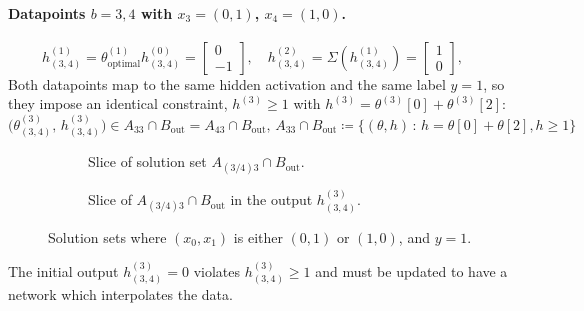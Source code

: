 \paragraph{Datapoints $b=3,4$ with $x_3=(0,1)$, $x_4=(1,0)$.}
\[
    h_{(3,4)}^{(1)} = \theta^{(1)}_{\mathrm{optimal}} h_{(3,4)}^{(0)} = \begin{bmatrix} 0 \\ -1 \end{bmatrix},\quad
    h_{(3,4)}^{(2)} = \Sigma\left( h_{(3,4)}^{(1)} \right) =  \begin{bmatrix} 1 \\ 0 \end{bmatrix},\quad
\]
Both datapoints map to the same hidden activation and the
same label $y=1$, so they impose an identical constraint, $h^{(3)}\ge1$ with
$h^{(3)}=\theta^{(3)}[0]+\theta^{(3)}[2]$:
\begin{equation*}
  \bigl(\theta_{({3,4})}^{(3)},\, h_{({3,4})}^{(3)}\bigr) \in A_{33} \cap B_{\mathrm{out}}
  = A_{43} \cap B_{\mathrm{out}},\,
  A_{33} \cap B_{\mathrm{out}} \coloneq \bigl\{(\theta,h) \,:\, h = \theta[0] + \theta[2], h \ge 1\bigr\}
\end{equation*}
\vspace{0.2em}

\begin{figure}[h]
\centering
\begin{subfigure}[t]{0.48\textwidth}
\centering

\caption{Slice of solution set $A_{(3/4)3} \cap B_{\mathrm{out}}$.}
\label{fig:xor_output_relation_w1_wb_pos}
\end{subfigure}
\hfill
\begin{subfigure}[t]{0.48\textwidth}
\centering

\caption{Slice of $A_{(3/4)3}  \cap B_{\mathrm{out}}$ in the output $h_{(3,4)}^{(3)}$.}
\label{fig:xor_pos_y}
\end{subfigure}
\label{fig:xor_output_relation_pos}
\caption{Solution sets where $(x_0, x_1)$ is either $(0, 1)$ or $(1, 0)$, and $y = 1$.}
\end{figure}
The initial output $h_{(3,4)}^{(3)} = 0$ violates $h_{(3,4)}^{(3)}  \ge 1$ and must be updated to have a network which interpolates the data.

